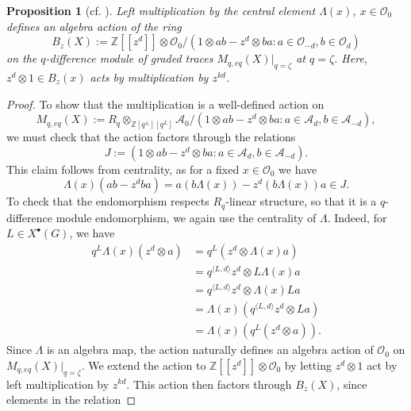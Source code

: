 \documentclass[reqno]{amsart}
\numberwithin{equation}{section}
\numberwithin{equation}{section}
\numberwithin{equation}{section}
\newtheorem{prop}[thm]{Proposition}
\theoremstyle{definition}
\theoremstyle{remark}
\theoremstyle{remark}
\begin{document}
\begin{prop}[{cf. \cite[Proposition 3.14, Proposition 3.15]{bai-lee}}]
    Left multiplication by the central element $\Lambda(x)$, $x \in \mathcal{O}_0$ defines an algebra action of the ring
    \begin{equation}\label{eqn:quantum-b-algebra}
        B_z(X) := \mathbb{Z}[\![z^d]\!] \otimes \mathcal{O}_0 / ( 1 \otimes ab - z^d \otimes ba : a \in \mathcal{O}_{-d}, b \in \mathcal{O}_d)
    \end{equation}
    on the $q$-difference module of graded traces $M_{q, eq}(X)|_{q=\zeta}$ at $q = \zeta$. Here, $z^d \otimes 1 \in B_z(x)$ acts by multiplication by $z^{kd}$. 
\end{prop}
\begin{proof}
    To show that the multiplication is a well-defined action on
    \begin{equation}
        M_{q, eq}(X) := R_q \otimes_{\mathbb{Z}[q^\pm][q^L]} \mathcal{A}_0 / ( 1 \otimes ab - z^d \otimes ba : a \in \mathcal{A}_{d}, b \in \mathcal{A}_{-d}),
    \end{equation}
    we must check that the action factors through the relations
    \begin{equation}
        J := ( 1 \otimes ab - z^d \otimes ba : a \in \mathcal{A}_{d}, b \in \mathcal{A}_{-d}).
    \end{equation}
    This claim follows from centrality, as for a fixed $x \in \mathcal{O}_0$ we have
    \begin{equation}
        \Lambda(x) (ab - z^d ba) = a \left( b \Lambda(x) \right) - z^d (b \Lambda(x)) a \in J.
    \end{equation}
    To check that the endomorphism respects $R_q$-linear structure, so that it is a $q$-difference module endomorphism, we again use the centrality of $\Lambda$. Indeed, for $L \in X^\bullet(G)$, we have
    \begin{align}
        q^L  \Lambda(x) (z^d \otimes a) & = q^L (z^d \otimes \Lambda(x) a) \\
        &= q^{\langle L, d\rangle} z^d \otimes L\Lambda(x)a \\
        &= q^{\langle L, d \rangle} z^d \otimes \Lambda(x) La \\
        &= \Lambda(x) \left( q^{\langle L, d \rangle} z^d \otimes La \right) \\
        &= \Lambda(x) \left( q^L (z^d \otimes a) \right).
    \end{align}
    Since $\Lambda$ is an algebra map, the action naturally defines an algebra action of $\mathcal{O}_0$ on $M_{q, eq}(X)|_{q=\zeta}$. We extend the action to $\mathbb{Z}[\![z^d ]\!] \otimes \mathcal{O}_0$ by letting $z^d \otimes 1 $ act by left multiplication by $z^{kd}$. This action then factors through $B_z(X)$, since elements in the relation

\end{proof}
\end{document}
